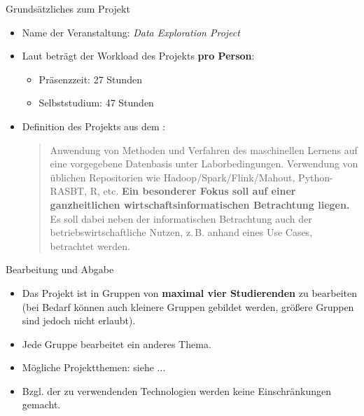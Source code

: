\begin{dwHeaderFrame}{Grundsätzliches zum Projekt}
	\begin{itemize}
		\item Name der Veranstaltung: \textit{Data Exploration Project}
		\item Laut \modulkatalog{} beträgt der Workload des Projekts \textbf{pro Person}:
		\begin{itemize}
			\item Präsenzzeit: 27 Stunden
			\item Selbststudium: 47 Stunden
		\end{itemize}
		\item Definition des Projekts aus dem \modulkatalog:
		\begin{quote}
			\glqq{}Anwendung von Methoden und Verfahren des maschinellen Lernens auf eine vorgegebene Datenbasis unter Laborbedingungen. Verwendung von üblichen Repositorien wie Hadoop/Spark/Flink/Mahout, Python-RASBT, R, etc.
			\textbf{Ein besonderer Fokus soll auf einer ganzheitlichen wirtschaftsinformatischen Betrachtung liegen.} Es soll dabei neben der informatischen Betrachtung auch der betriebswirtschaftliche Nutzen, z.\,B. anhand eines Use Cases, betrachtet werden.\grqq{}
		\end{quote}
	\end{itemize}
\end{dwHeaderFrame}


\begin{dwHeaderFrame}{Bearbeitung und Abgabe}
	\begin{itemize}
		\item Das Projekt ist in Gruppen von \textbf{maximal vier Studierenden} zu bearbeiten (bei Bedarf können auch kleinere Gruppen gebildet werden, größere Gruppen sind jedoch nicht erlaubt).
		\item Jede Gruppe bearbeitet ein anderes Thema.
		\item Mögliche Projektthemen: siehe ...
		\item Bzgl. der zu verwendenden Technologien werden keine Einschränkungen gemacht.
	\end{itemize}
	
\end{dwHeaderFrame}


